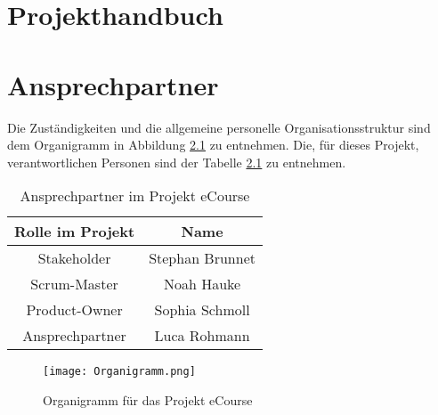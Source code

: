 
\chapter{Projekthandbuch}

\chapter{Ansprechpartner}
Die Zuständigkeiten und die allgemeine personelle Organisationsstruktur sind dem Organigramm in Abbildung \ref{fib:Organigramm} zu entnehmen.
Die, für dieses Projekt, verantwortlichen Personen sind der Tabelle \ref{tab:Ansprechpartner} zu entnehmen.

\begin{table} [H]
\centering
\begin{tabular} {|c|c|} 
\hline
Rolle im Projekt & Name \\
\hline
Stakeholder & Stephan Brunnet  \\
\hline
Scrum-Master & Noah Hauke \\
\hline
Product-Owner & Sophia Schmoll \\
\hline
Ansprechpartner & Luca Rohmann \\
\hline
\end{tabular}
\caption{Ansprechpartner im Projekt eCourse}
\label{tab:Ansprechpartner}
\end{table}


\begin{figure}[h]
\centering
\texttt{[image: Organigramm.png]}
\caption{Organigramm für das Projekt eCourse}
\label{fib:Organigramm}
\end{figure}
